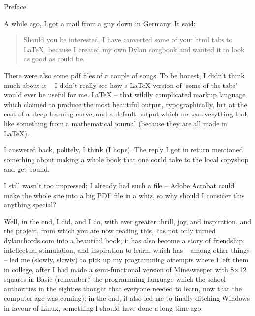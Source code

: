 
\thispagestyle{empty}
\label{preface}

\vspace*{20ex}

\begin{flushright}{\Huge Preface}\end{flushright}

\vspace{10ex}
    
\noindent A while ago, I got a mail from a guy down in Germany. It said:

\begin{quote}
Should you be interested, I have converted some of your html tabs to
LaTeX, because I created my own Dylan songbook and wanted it to look
as good as could be.
\end{quote}
  
There were also some pdf files of a couple of songs. To be honest, I
didn't think much about it -- I didn't really see how a LaTeX version
of `some of the tabs' would ever be useful for me. LaTeX --
that wildly complicated markup language which claimed to produce the
most beautiful output, typographically, but at the cost of a steep
learning curve, and a default output which makes everything look like
something from a mathematical journal (because they are all made in
LaTeX).
 
I answered back, politely, I think (I hope). The reply I got in return
mentioned something about making a whole book that one could take to
the local copyshop and get bound.
 
I still wasn't too impressed; I already had such a file -- Adobe
Acrobat could make the whole site into a big PDF file in a whiz, so
why should I consider this anything special?
  
Well, in the end, I did, and I do, with ever greater thrill, joy, and
inspiration, and the project, from which you are now reading this, has
not only turned dylanchords.com into a beautiful book, it has also
become a story of friendship, intellectual stimulation, and
inspiration to learn, which has -- among other things -- led me
(slowly, slowly) to pick up my programming attempts where I left them
in college, after I had made a semi-functional version of Minesweeper
with 8$\times$12 squares in Basic (remember? the programming language which
the school authorities in the eighties thought that everyone needed to
learn, now that the computer age was coming); in the end, it also led
me to finally ditching Windows in favour of Linux, something I should
have done a long time ago.

